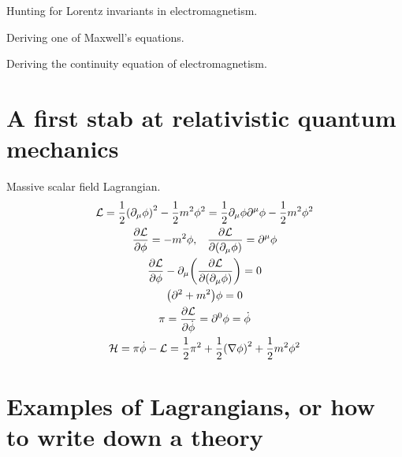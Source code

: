 \documentclass{report}
\begin{document}
\begin{subquests}
	\item Hunting for Lorentz invariants in electromagnetism.

	\item Deriving one of Maxwell's equations.

	\item Deriving the continuity equation of electromagnetism.
\end{subquests}


\chapter{A first stab at relativistic quantum mechanics}

\begin{subquests}
	\item Massive scalar field Lagrangian.
	\begin{gather*}
		\mathcal L = \frac{1}{2}\pqty{\partial_{\mu}\phi}^2 - \frac{1}{2}m^2\phi^2  = \frac{1}{2}\partial_{\mu}\phi\partial^{\mu}\phi - \frac{1}{2}m^2\phi^2 \\
		\pdv{\mathcal L}{\phi} = -m^2\phi, \;\;\; \pdv{\mathcal L}{\pqty{\partial_{\mu}\phi}} = \partial^{\mu}\phi \\
		\pdv{\mathcal L}{\phi}-\partial_{\mu}\pqty{\pdv{\mathcal L}{\pqty{\partial_{\mu}\phi}}} = 0 \\
		\pqty{\partial^2 + m^2}\phi = 0 \\
		\pi = \pdv{\mathcal L}{\dot{\phi}} = \partial^0 \phi = \dot{\phi} \\
		\mathcal H = \pi\dot{\phi} - \mathcal L = \frac{1}{2}\pi^2 + \frac{1}{2}\pqty{\nabla{\phi}}^2 + \frac{1}{2}m^2\phi^2 \\
	\end{gather*}
\end{subquests}

\chapter{Examples of Lagrangians, or how to write down a theory}
\end{document}
